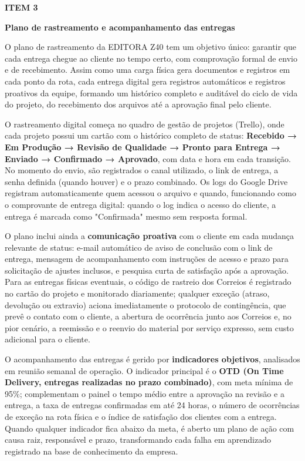 \documentclass[10pt,a4paper]{article}
\newcommand{\labelfont}{\fontsize{5.8}{7.5}\selectfont\bfseries\addfontfeatures{LetterSpace=15}}
\newcommand{\headingfont}{\fontsize{9.8}{12}\selectfont\bfseries\color{navy}}
\newcommand{\separador}{\vspace{16pt}{\color{rulegray}\rule{\linewidth}{0.6pt}}\vspace{10pt}}
\newcommand{\itemh}[2]{\needspace{6\baselineskip}%
  {\labelfont\color{graylab}ITEM #1}\par\vspace{5pt}%
  {\headingfont #2}\par\vspace{8pt}}
\begin{document}
\separador
\itemh{3}{Plano de rastreamento e acompanhamento das entregas}

O plano de rastreamento da EDITORA Z40 tem um objetivo único: garantir que cada entrega chegue ao cliente no tempo certo, com comprovação formal de envio e de recebimento. Assim como uma carga física gera documentos e registros em cada ponto da rota, cada entrega digital gera registros automáticos e registros proativos da equipe, formando um histórico completo e auditável do ciclo de vida do projeto, do recebimento dos arquivos até a aprovação final pelo cliente.

O rastreamento digital começa no quadro de gestão de projetos (Trello), onde cada projeto possui um cartão com o histórico completo de status: \textbf{Recebido → Em Produção → Revisão de Qualidade → Pronto para Entrega → Enviado → Confirmado → Aprovado}, com data e hora em cada transição. No momento do envio, são registrados o canal utilizado, o link de entrega, a senha definida (quando houver) e o prazo combinado. Os logs do Google Drive registram automaticamente quem acessou o arquivo e quando, funcionando como o comprovante de entrega digital: quando o log indica o acesso do cliente, a entrega é marcada como "Confirmada" mesmo sem resposta formal.

O plano inclui ainda a \textbf{comunicação proativa} com o cliente em cada mudança relevante de status: e-mail automático de aviso de conclusão com o link de entrega, mensagem de acompanhamento com instruções de acesso e prazo para solicitação de ajustes inclusos, e pesquisa curta de satisfação após a aprovação. Para as entregas físicas eventuais, o código de rastreio dos Correios é registrado no cartão do projeto e monitorado diariamente; qualquer exceção (atraso, devolução ou extravio) aciona imediatamente o protocolo de contingência, que prevê o contato com o cliente, a abertura de ocorrência junto aos Correios e, no pior cenário, a reemissão e o reenvio do material por serviço expresso, sem custo adicional para o cliente.

O acompanhamento das entregas é gerido por \textbf{indicadores objetivos}, analisados em reunião semanal de operação. O indicador principal é o \textbf{OTD (On Time Delivery, entregas realizadas no prazo combinado)}, com meta mínima de 95\%; complementam o painel o tempo médio entre a aprovação na revisão e a entrega, a taxa de entregas confirmadas em até 24 horas, o número de ocorrências de exceção na rota física e o índice de satisfação dos clientes com a entrega. Quando qualquer indicador fica abaixo da meta, é aberto um plano de ação com causa raiz, responsável e prazo, transformando cada falha em aprendizado registrado na base de conhecimento da empresa.
\end{document}
